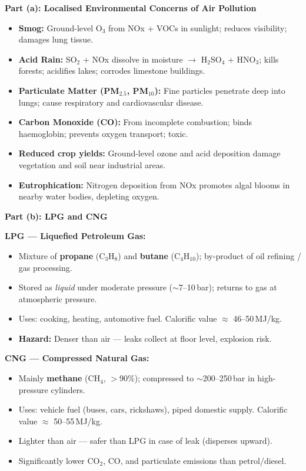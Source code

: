 \documentclass[12pt,a3paper]{article}
\begin{document}
\begin{enumerate}
\begin{tcolorbox}[enhanced,breakable,ansbox,colback=cA!4,colframe=cA,
  boxrule=0.8pt,arc=5pt,
  title={\textbf{Answer}},fonttitle=\bfseries\color{white},colbacktitle=cA]

\textbf{Part (a): Localised Environmental Concerns of Air Pollution}

\begin{itemize}[leftmargin=1.5em,itemsep=2pt]
  \item \textbf{Smog:} Ground-level O$_3$ from NOx + VOCs in sunlight; reduces visibility; damages lung tissue.
  \item \textbf{Acid Rain:} SO$_2$ + NOx dissolve in moisture $\to$ H$_2$SO$_4$ + HNO$_3$; kills forests; acidifies lakes; corrodes limestone buildings.
  \item \textbf{Particulate Matter (PM$_{2.5}$, PM$_{10}$):} Fine particles penetrate deep into lungs; cause respiratory and cardiovascular disease.
  \item \textbf{Carbon Monoxide (CO):} From incomplete combustion; binds haemoglobin; prevents oxygen transport; toxic.
  \item \textbf{Reduced crop yields:} Ground-level ozone and acid deposition damage vegetation and soil near industrial areas.
  \item \textbf{Eutrophication:} Nitrogen deposition from NOx promotes algal blooms in nearby water bodies, depleting oxygen.
\end{itemize}

\hrulefill

\textbf{Part (b): LPG and CNG}

\textbf{LPG — Liquefied Petroleum Gas:}
\begin{itemize}[leftmargin=1.5em,itemsep=1pt]
  \item Mixture of \textbf{propane} (C$_3$H$_8$) and \textbf{butane} (C$_4$H$_{10}$); by-product of oil refining / gas processing.
  \item Stored as \emph{liquid} under moderate pressure ($\sim$7--10\,bar); returns to gas at atmospheric pressure.
  \item Uses: cooking, heating, automotive fuel. Calorific value $\approx$ 46--50\,MJ/kg.
  \item \textbf{Hazard:} Denser than air — leaks collect at floor level, explosion risk.
\end{itemize}

\textbf{CNG — Compressed Natural Gas:}
\begin{itemize}[leftmargin=1.5em,itemsep=1pt]
  \item Mainly \textbf{methane} (CH$_4$, $>$90\%); compressed to $\sim$200--250\,bar in high-pressure cylinders.
  \item Uses: vehicle fuel (buses, cars, rickshaws), piped domestic supply. Calorific value $\approx$ 50--55\,MJ/kg.
  \item Lighter than air — safer than LPG in case of leak (disperses upward).
  \item Significantly lower CO$_2$, CO, and particulate emissions than petrol/diesel.
\end{itemize}


\end{tcolorbox}
\end{enumerate}
\end{document}
